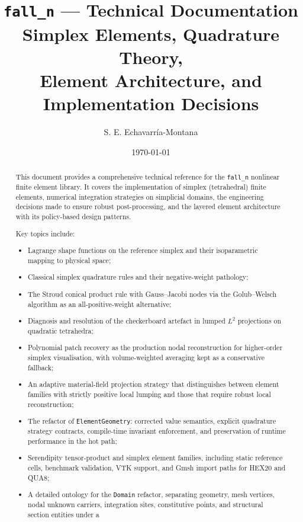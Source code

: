 \documentclass[11pt,a4paper]{report}
\title{%
  \textbf{\texttt{fall\_n}} --- Technical Documentation\\[1ex]
  \large Simplex Elements, Quadrature Theory,\\
  Element Architecture, and Implementation Decisions}
\author{S. E. Echavarría-Montana}
\date{\today}
\theoremstyle{definition}
\begin{document}
\maketitle

\begin{abstract}
This document provides a comprehensive technical reference for the
\texttt{fall\_n} nonlinear finite element library.  It covers the
implementation of simplex (tetrahedral) finite elements, numerical integration
strategies on simplicial domains, the engineering decisions made to ensure
robust post-processing, and the layered element architecture with its
policy-based design patterns.

Key topics include:
\begin{itemize}[nosep]
  \item Lagrange shape functions on the reference simplex and their isoparametric
        mapping to physical space;
  \item Classical simplex quadrature rules and their negative-weight pathology;
  \item The Stroud conical product rule with Gauss--Jacobi nodes via the
        Golub--Welsch algorithm as an all-positive-weight alternative;
  \item Diagnosis and resolution of the checkerboard artefact in lumped $L^2$
        projections on quadratic tetrahedra;
  \item Polynomial patch recovery as the production nodal reconstruction for
        higher-order simplex visualisation, with volume-weighted averaging kept
        as a conservative fallback;
  \item An adaptive material-field projection strategy that distinguishes
        between element families with strictly positive local lumping and
        those that require robust local reconstruction;
  \item The refactor of \texttt{ElementGeometry}: corrected value semantics,
        explicit quadrature strategy contracts, compile-time invariant
        enforcement, and preservation of runtime performance in the hot path;
  \item Serendipity tensor-product and simplex element families, including
        static reference cells, benchmark validation, VTK support, and Gmsh
        import paths for HEX20 and QUA8;
  \item A detailed ontology for the \texttt{Domain} refactor, separating
        geometry, mesh vertices, nodal unknown carriers, integration sites,
        constitutive points, and structural section entities under a

\end{itemize}
\end{abstract}
\end{document}
